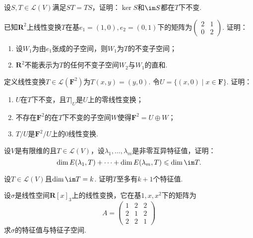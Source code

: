 \begin{exercise}

    \begin{exgroup}
        \item 设$S,T\in \mathcal{L}(V)$满足$ST=TS$，证明：$\ker S$和$\im S$都在$T$下不变.

        \item 已知$\mathbf{R}^2$上线性变换$T$在基$e_1=(1,0),e_2=(0,1)$下的矩阵为$\begin{pmatrix}2 & 1 \\ 0 & 2\end{pmatrix}$. 证明：
        \begin{enumerate}
            \item 设$W_1$为由$e_1$张成的子空间，则$W_1$为$T$的不变子空间；

            \item $\mathbf{R}^2$不能表示为$T$的任何不变子空间$W_2$与$W_1$的直和.
        \end{enumerate}

        \item 定义线性变换$T\in \mathcal{L}(\mathbf{F}^2)$为$T(x,y)=(y,0)$. 令$U=\{(x,0) \mid x\in\mathbf{F}\}$. 证明：
        \begin{enumerate}
            \item $U$在$T$下不变，且$T|_{U}$是$U$上的零线性变换；

            \item 不存在$\mathbf{F}^2$的在$T$下不变的子空间$W$使得$\mathbf{F}^2=U\oplus W$；

            \item $T/U$是$\mathbf{F}^2/U$上的0线性变换.
        \end{enumerate}

        \item 设$V$是有限维的且$T\in \mathcal{L}(V)$，设$\lambda_1,\ldots,\lambda_m$是非零互异特征值，证明：
        \[ \dim E(\lambda_1,T)+\cdots+\dim E(\lambda_m,T)\leqslant\dim\im T. \]

        \item 设$T\in \mathcal{L}(V)$且$\dim\im T=k$. 证明$T$至多有$k+1$个特征值.

        \item 设$\sigma$是线性空间$\mathbf{R}[x]_3$上的线性变换，它在基$1,x,x^2$下的矩阵为
        \[ A=\begin{pmatrix}
                1 & 2 & 2 \\ 2 & 1 & 2 \\ 2 & 2 & 1
            \end{pmatrix}\]
        求$\sigma$的特征值与特征子空间.


\end{exgroup}
\end{exercise}
